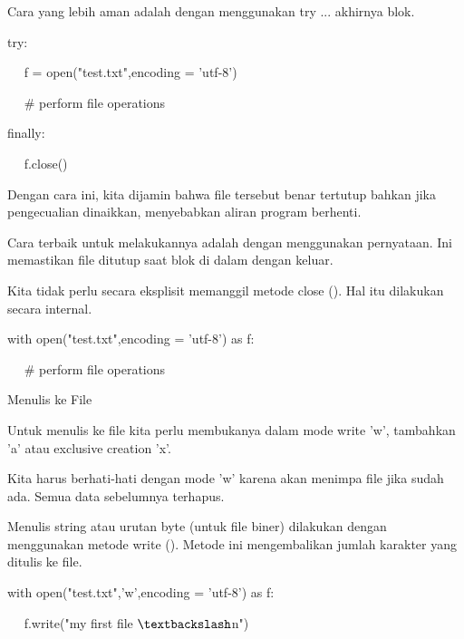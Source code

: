 \vspace{12pt}
Cara yang lebih aman adalah dengan menggunakan try ... akhirnya blok. \par
\vspace{12pt}
try: \par
~~ f = open("test.txt",encoding = 'utf-8') \par
~~  $  \#  $ perform file operations \par
finally: \par
~~ f.close() \par
\vspace{12pt}
Dengan cara ini, kita dijamin bahwa file tersebut benar tertutup bahkan jika pengecualian dinaikkan, menyebabkan aliran program berhenti. \par
\vspace{12pt}
Cara terbaik untuk melakukannya adalah dengan menggunakan pernyataan. Ini memastikan file ditutup saat blok di dalam dengan keluar. \par
\vspace{12pt}
Kita tidak perlu secara eksplisit memanggil metode close (). Hal itu dilakukan secara internal. \par
\vspace{12pt}
with open("test.txt",encoding = 'utf-8') as f: \par
~~  $  \#  $ perform file operations \par
\vspace{12pt}
\vspace{12pt}
\vspace{12pt}
\vspace{12pt}
Menulis ke File \par
\vspace{12pt}
Untuk menulis ke file kita perlu membukanya dalam mode write 'w', tambahkan 'a' atau exclusive creation 'x'. \par
\vspace{12pt}
Kita harus berhati-hati dengan mode 'w' karena akan menimpa file jika sudah ada. Semua data sebelumnya terhapus. \par
\vspace{12pt}
Menulis string atau urutan byte (untuk file biner) dilakukan dengan menggunakan metode write (). Metode ini mengembalikan jumlah karakter yang ditulis ke file. \par
\vspace{12pt}
with open("test.txt",'w',encoding = 'utf-8') as f: \par
~~ f.write("my first file $  \textbackslash  $n") \par
